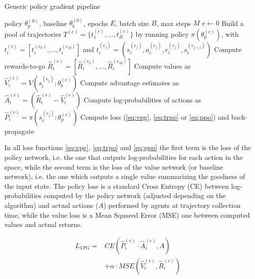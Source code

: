 \documentclass{article}
\begin{document}
\begin{algorithm}[h]
  \caption{Generic policy gradient pipeline}
  \label{alg:pg}
  \begin{algorithmic}[1]
    \Require policy $\theta_p^{(0)}$, baseline $\theta_b^{(0)}$, epochs $E$, batch size $B$, max steps $M$
    \State $e \gets 0$
      \State Build a pool of trajectories $T^{(e)}=\{t_1^{(e)},\dots,t_B^{(e)}\}$ by running policy $\pi(\theta_p^{(e)})$, \newline\hspace*{1.5em}with $t_i^{(e)}=[t_i^{(e_0)},\dots,t_i^{(e_M)}]$ and $t_i^{(e_j)}=(s_i^{(e_j)}, a_i^{(e_j)}, r_i^{(e_j)}, s_i^{(e_{j+1})})$
      \State Compute rewards-to-go $\hat{R}_i^{(e)}=[\hat{R}_i^{(e_0)}, \dots, \hat{R}_i^{(e_M)}]$ 
      \State Compute values as $\hat{V}_i^{(e)}=V(s_i^{(e_j)};\theta_b^{(e)})$ 
      \State Compute advantage estimates as $\hat{A}_i^{(e)}=(\hat{R}_i^{(e)}-\hat{V}_i^{(e)})$
      \State Compute log-probabilities of actions as $\hat{P}_i^{(e)}=\pi(s_i^{(e_j)};\theta_p^{(e)})$ \vspace{1mm}
      \State Compute loss (\ref{eq:vpg}, \ref{eq:trpo} or \ref{eq:ppo}) and back-propagate
    \EndWhile
  \end{algorithmic}
\end{algorithm}

In all loss functions \ref{eq:vpg}, \ref{eq:trpo} and \ref{eq:ppo} the first term is the loss of the policy network, i.e. the one that outputs log-probabilities for each action in the space, while the second term is the loss of the value network (or baseline network), i.e. the one which outputs a single value summarizing the goodness of the input state. The policy loss is a standard Cross Entropy (CE) between log-probabilities computed by the policy network (adjusted depending on the algorithm) and actual actions ($A$) performed by agents at trajectory collection time, while the value loss is a Mean Squared Error (MSE) one between computed values and actual returns.

\begin{equation}
  \label{eq:vpg}
  \begin{aligned}
    L_{VPG}={} & CE\left(\hat{P}_i^{(e)}\cdot \hat{A}_i^{(e)}, A\right) \\
    & + \alpha\cdot MSE\left(\hat{V}_i^{(e)}, \hat{R}_i^{(e)}\right)
  \end{aligned}
\end{equation}
\end{document}
